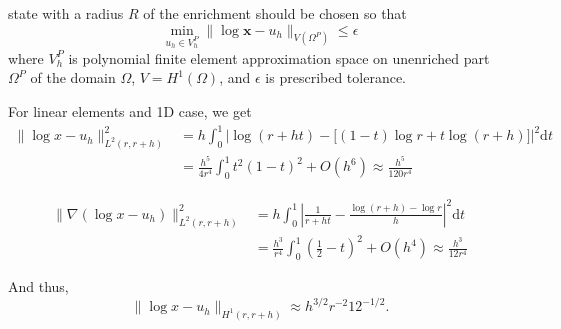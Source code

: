 \documentclass[preprint,12pt]{elsarticle}
\def\vc#1{\mathbf{\boldsymbol{#1}}}     %
\def\abs#1{\left|#1\right|}
\def\d{\mathrm{d}}
\def\abs#1{| #1 |}
\begin{document}
state with a radius $R$ of the 
enrichment should be chosen so that 
\[
   \min\limits_{u_h \in V^P_h} \| \log  \vc x - u_h\|_{V(\Omega^P)} \le \epsilon
\]
where $V^P_h$ is polynomial finite element approximation space on unenriched part $\Omega^P$ of the domain $\Omega$, 
$V = H^1(\Omega)$, and $\epsilon$ is prescribed tolerance. 

For linear elements and 1D case, we get
\begin{align*}
 \|\log x - u_h\|^2_{L^2(r,r+h)} 
 &= h\int_0^1 \abs{\log(r+ht) - \big[ (1-t)\log r + t\log(r+h) \big]}^2\d t\\
 &= \frac{h^5}{4r^4}\int_0^1 t^2(1-t)^2 + O(h^6)\approx \frac{h^5}{120 r^4}
\end{align*}

\begin{align*}
 \|\nabla (\log x - u_h)\|^2_{L^2(r,r+h)} &=
 h\int_0^1 \abs{\frac{1}{r+ht} - \frac{\log(r+h) - \log r}{h}}^2\d t \\
 &=
\frac{h^3}{r^4}\int_0^1 (\frac12-t)^2 + O(h^4)\approx 
\frac{h^3}{12 r^4}
\end{align*}

And thus,
\begin{equation} \label{eqn:log_h1_estimate}
  \|\log x - u_h\|_{H^1(r,r+h)} \approx h^{3/2} r^{-2} 12^{-1/2}.
\end{equation}
\end{document}
